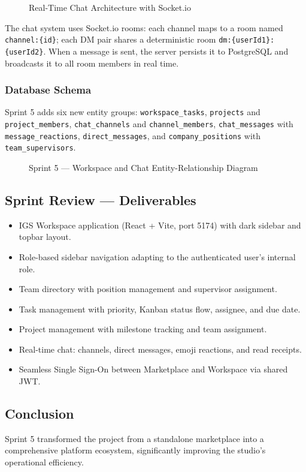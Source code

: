 \begin{figure}[H]
\centering
\resizebox{0.9\textwidth}{!}{}
\caption{Real-Time Chat Architecture with Socket.io}
\label{fig:sprint5_chat}
\end{figure}

The chat system uses Socket.io rooms: each channel maps to a room named \texttt{channel:\{id\}}; each DM pair shares a deterministic room \texttt{dm:\{userId1\}:\{userId2\}}. When a message is sent, the server persists it to PostgreSQL and broadcasts it to all room members in real time.

\subsubsection{Database Schema}

Sprint 5 adds six new entity groups: \texttt{workspace\_tasks}, \texttt{projects} and \texttt{project\_members}, \texttt{chat\_channels} and \texttt{channel\_members}, \texttt{chat\_messages} with \texttt{message\_reactions}, \texttt{direct\_messages}, and \texttt{company\_positions} with \texttt{team\_supervisors}.

\begin{figure}[H]
\centering
\resizebox{\textwidth}{!}{}
\caption{Sprint 5 --- Workspace and Chat Entity-Relationship Diagram}
\label{fig:sprint5_erd}
\end{figure}

\subsection{Sprint Review --- Deliverables}

\begin{itemize}
  \item IGS Workspace application (React + Vite, port 5174) with dark sidebar and topbar layout.
  \item Role-based sidebar navigation adapting to the authenticated user's internal role.
  \item Team directory with position management and supervisor assignment.
  \item Task management with priority, Kanban status flow, assignee, and due date.
  \item Project management with milestone tracking and team assignment.
  \item Real-time chat: channels, direct messages, emoji reactions, and read receipts.
  \item Seamless Single Sign-On between Marketplace and Workspace via shared JWT.
\end{itemize}

\subsection*{Conclusion}
Sprint 5 transformed the project from a standalone marketplace into a comprehensive platform ecosystem, significantly improving the studio's operational efficiency.
